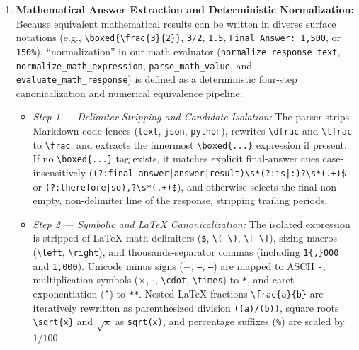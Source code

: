 \documentclass[a4paper,fleqn]{cas-sc}
\providecommand{\tightlist}{%
  \setlength{\itemsep}{0pt}\setlength{\parskip}{0pt}}
\begin{document}
\begin{enumerate}
\item \textbf{Mathematical Answer Extraction and Deterministic Normalization:}
Because equivalent mathematical results can be written in diverse surface notations (e.g., \texttt{\textbackslash boxed\{\textbackslash frac\{3\}\{2\}\}}, \texttt{3/2}, \texttt{1.5}, \texttt{Final Answer: 1,500}, or \texttt{150\%}), ``normalization'' in our math evaluator (\texttt{normalize\_response\_text}, \texttt{normalize\_math\_expression}, \texttt{parse\_math\_value}, and \texttt{evaluate\_math\_response}) is defined as a deterministic four-step canonicalization and numerical equivalence pipeline:
\begin{itemize}
\tightlist
\item \emph{Step 1 --- Delimiter Stripping and Candidate Isolation:} The parser strips Markdown code fences (\texttt{\textasciigrave\textasciigrave\textasciigrave text}, \texttt{\textasciigrave\textasciigrave\textasciigrave json}, \texttt{\textasciigrave\textasciigrave\textasciigrave python}), rewrites \texttt{\textbackslash dfrac} and \texttt{\textbackslash tfrac} to \texttt{\textbackslash frac}, and extracts the innermost \texttt{\textbackslash boxed\{...\}} expression if present. If no \texttt{\textbackslash boxed\{...\}} tag exists, it matches explicit final-answer cues case-insensitively (\texttt{(?:final answer|answer|result)\textbackslash s*(?:is|:)?\textbackslash s*(.+)\$} or \texttt{(?:therefore|so),?\textbackslash s*(.+)\$}), and otherwise selects the final non-empty, non-delimiter line of the response, stripping trailing periods.
\item \emph{Step 2 --- Symbolic and \LaTeX{} Canonicalization:} The isolated expression is stripped of \LaTeX{} math delimiters (\texttt{\$}, \texttt{\textbackslash(\,\textbackslash)}, \texttt{\textbackslash[\,\textbackslash]}), sizing macros (\texttt{\textbackslash left}, \texttt{\textbackslash right}), and thousands-separator commas (including \texttt{1\{,\}000} and \texttt{1,000}). Unicode minus signs (\texttt{$-$}, \texttt{--}, \texttt{---}) are mapped to ASCII \texttt{-}, multiplication symbols (\texttt{$\times$}, \texttt{$\cdot$}, \texttt{\textbackslash cdot}, \texttt{\textbackslash times}) to \texttt{*}, and caret exponentiation (\texttt{\^{}}) to \texttt{**}. Nested \LaTeX{} fractions \texttt{\textbackslash frac\{a\}\{b\}} are iteratively rewritten as parenthesized division \texttt{((a)/(b))}, square roots \texttt{\textbackslash sqrt\{x\}} and \texttt{$\sqrt{\text{x}}$} as \texttt{sqrt(x)}, and percentage suffixes (\texttt{\%}) are scaled by $1/100$.

\end{itemize}
\end{enumerate}
\end{document}
